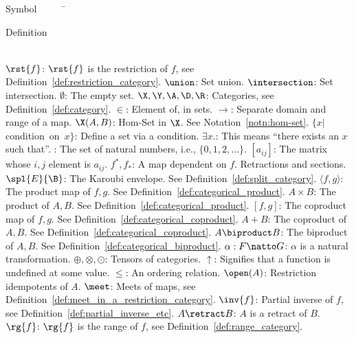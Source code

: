 


\begin{tabbing}
Symbol~~~~~\= \ \ \ \ \ \ \ \ \ \ \ \ \ \ \ \ \ \ \ \ \ \ \ \ \ \ \ \ \ \ \ \ \ \ \ \  \parbox{5in}{Definition}\\

\addsymbol \mbox{$\rst{f}$}: {$\rst{f}$ is the restriction of $f$, see Definition~\ref{def:restriction_category}.}
\addsymbol \mbox{$\union$}: {Set union.}
\addsymbol \mbox{$\intersection$}: {Set intersection.}
\addsymbol \mbox{$\emptyset$}: {The empty set.}
\addsymbol \mbox{$\X,\Y, \A,\D,\R$}: {Categories, see Definition~\ref{def:category}.}
\addsymbol \mbox{$\in$}: {Element of, in sets.}
\addsymbol \mbox{$\to$}: {Separate domain and range of a map.}
\addsymbol \mbox{$\X(A,B)$}: {Hom-Set in $\X$. See Notation~\ref{notn:hom-set}.}
\addsymbol \mbox{$\{x | $condition on $x\}$}: {Define a set via a condition.}
\addsymbol \mbox{$\exists x.$}: {This means ``there exists an $x$ such that''.}
\addsymbol \mbox{\nat}: {The set of natural numbers, i.e., $\{0,1,2,\ldots\}$.}
\addsymbol \mbox{$[a_{ij}]$}: {The matrix whose $i,j$ element is $a_{ij}$.}
\addsymbol \mbox{$f^*, f_*$}: {A map dependent on $f$. Retractions and sections.}
\addsymbol \mbox{$\spl{E}{\B}$}: {The Karoubi envelope. See  Definition~\ref{def:split_category}.}
\addsymbol \mbox{$\langle f,g\rangle$}: {The product map of $f,g$. See Definition~\ref{def:categorical_product}.}
\addsymbol \mbox{$A\times B$}: {The product of $A,B$. See Definition~\ref{def:categorical_product}.}
\addsymbol \mbox{$[f,g]$}: {The coproduct map of $f,g$. See Definition~\ref{def:categorical_coproduct}.}
\addsymbol \mbox{$A+B$}: {The coproduct of $A,B$. See Definition~\ref{def:categorical_coproduct}.}
\addsymbol \mbox{$A\biproduct B$}: {The biproduct of $A,B$. See Definition~\ref{def:categorical_biproduct}.}
\addsymbol \mbox{$\alpha: F\natto G$}: {$\alpha$ is a natural transformation.}
\addsymbol \mbox{$\oplus,\otimes,\odot$}: {Tensors of categories.}
\addsymbol \mbox{$\uparrow$}: {Signifies that a function is undefined at some value.}
\addsymbol \mbox{$\le$}: {An ordering relation.}
\addsymbol \mbox{$\open(A)$}: {Restriction idempotents of $A$.}
\addsymbol \mbox{$\meet$}: {Meets of maps, see Definition~\ref{def:meet_in_a_restriction_category}.}
\addsymbol \mbox{$\inv{f}$}: {Partial inverse of $f$, see Definition~\ref{def:partial_inverse_etc}.}
\addsymbol \mbox{$A\retract B$}: {$A$ is a retract of $B$.}
\addsymbol \mbox{$\rg{f}$}: {$\rg{f}$ is the range of $f$, see Definition~\ref{def:range_category}.}

\end{tabbing}
